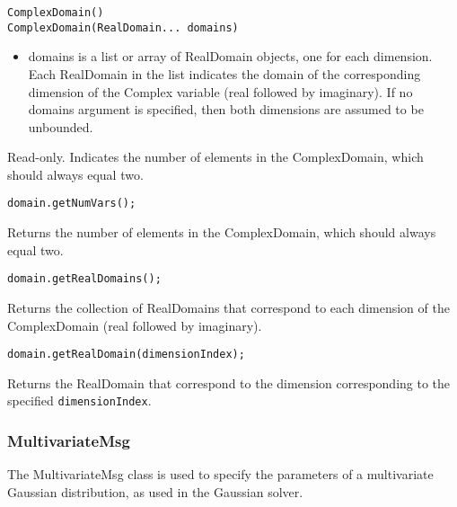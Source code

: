 \ifjava
\begin{lstlisting}
ComplexDomain()
ComplexDomain(RealDomain... domains)
\end{lstlisting}

\begin{itemize}
\item domains is a list or array of RealDomain objects, one for each dimension.  Each RealDomain in the list indicates the domain of the corresponding dimension of the Complex variable (real followed by imaginary).  If no domains argument is specified, then both dimensions are assumed to be unbounded.
\end{itemize}
\fi

\ifmatlab
{}


Read-only.  Indicates the number of elements in the ComplexDomain, which should always equal two.
\fi

\ifjava
{}


\begin{lstlisting}
domain.getNumVars();
\end{lstlisting}

Returns the number of elements in the ComplexDomain, which should always equal two.


\begin{lstlisting}
domain.getRealDomains();
\end{lstlisting}

Returns the collection of RealDomains that correspond to each dimension of the ComplexDomain (real followed by imaginary).


\begin{lstlisting}
domain.getRealDomain(dimensionIndex);
\end{lstlisting}

Returns the RealDomain that correspond to the dimension corresponding to the specified \texttt{dimensionIndex}.

\fi



\subsubsection{MultivariateMsg}
\label{sec:MultivariateMsg}

The MultivariateMsg class is used to specify the parameters of a multivariate Gaussian distribution, as used in the Gaussian solver.

